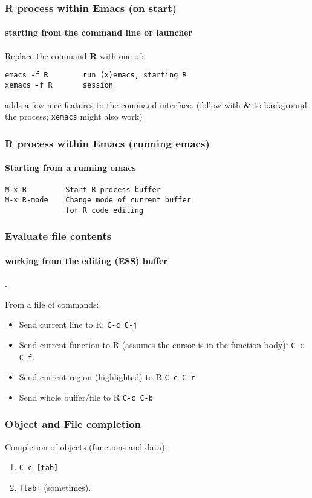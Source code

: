 \documentclass{beamer}
\begin{document}
\begin{frame}[fragile]
  \frametitle{R process within Emacs (on start)}
  \framesubtitle{starting from the command line or launcher}
  Replace the command \textbf{R} with one of:
\begin{verbatim}
emacs -f R        run (x)emacs, starting R
xemacs -f R       session                   
\end{verbatim}
  adds a few nice features to the command interface.  (follow with
  \textbf{\&} to background the process; \verb+xemacs+ might also
  work)
\end{frame}

\begin{frame}[fragile]
  \frametitle{R process within Emacs (running emacs)}
  \framesubtitle{Starting from a running emacs}
\begin{verbatim}
M-x R         Start R process buffer
M-x R-mode    Change mode of current buffer
              for R code editing
\end{verbatim}
\end{frame}

\begin{frame}[fragile]
  \frametitle{Evaluate file contents}
  \framesubtitle{working from the editing (ESS) buffer}. 

  From a file of commands:
  \begin{itemize}
  \item Send current line to R: \verb+C-c C-j+
  \item Send current function to R (assumes the cursor is in the
    function body): \verb+C-c C-f+.
  \item Send current region (highlighted) to R  \verb+C-c C-r+
  \item Send whole buffer/file to R  \verb+C-c C-b+
  \end{itemize}
\end{frame}

\begin{frame}[fragile]
  \frametitle{Object and File completion}
  Completion of objects (functions and data):
  \begin{enumerate}
  \item \verb+C-c [tab]+
  \item \verb+[tab]+ (sometimes).
  \end{enumerate}
\end{frame}
\end{document}
